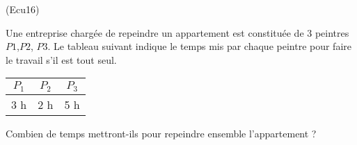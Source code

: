 \begin{tiny}(Ecu16)\end{tiny} Une entreprise chargée de repeindre un appartement est constituée de 3 peintres $P1$,$P2$, $P3$. Le tableau suivant indique le temps mis par chaque peintre pour faire le travail s'il est tout seul.
\begin{center}
\renewcommand{\arraystretch}{1.1}
\begin{tabular}{|c|c|c|} \hline
$P_1$ & $P_2$ & $P_3$\\ \hline
3 h   & 2 h   & 5 h \\ \hline
\end{tabular}
\end{center}
Combien de temps mettront-ils pour repeindre ensemble l'appartement ?

